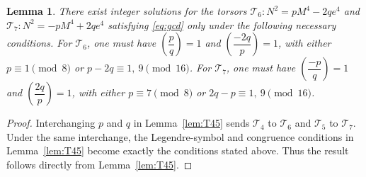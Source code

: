 \documentclass[12pt]{amsart}
\newcommand{\cT}{\mathcal{T}}
\numberwithin{equation}{section}
\newtheorem{lem}{Lemma}[section]
\theoremstyle{definition}
\begin{document}






 

\smallskip


\begin{lem}
\label{lem:T67}
There exist integer solutions for the torsors $\cT_{6}: N^{2}=pM^{4}-2qe^{4}$ and $\cT_{7}: N^{2}=-pM^{4}+2qe^{4}$ satisfying \eqref{eq:gcd} only under the following necessary conditions. For $\cT_{6}$, one must have $\left(\dfrac{p}{q}\right)=1$ and $\left(\dfrac{-2q}{p}\right)=1$, with either $p\equiv 1\pmod 8$ or $p-2q\equiv 1,~9\pmod {16}$. For $\cT_{7}$, one must have $\left(\dfrac{-p}{q}\right)=1$ and $\left(\dfrac{2q}{p}\right)=1$, with either $p\equiv 7\pmod 8$ or $2q-p\equiv 1,~9\pmod {16}$.
\end{lem}

\begin{proof}

Interchanging $p$ and $q$ in Lemma~\ref{lem:T45} sends
$\cT_4$ to $\cT_6$ and $\cT_5$ to $\cT_7$. Under the same interchange,
the Legendre-symbol and congruence conditions in Lemma~\ref{lem:T45} become
exactly the conditions stated above. Thus the result follows directly from
Lemma~\ref{lem:T45}.

\end{proof}







\smallskip
\end{document}
